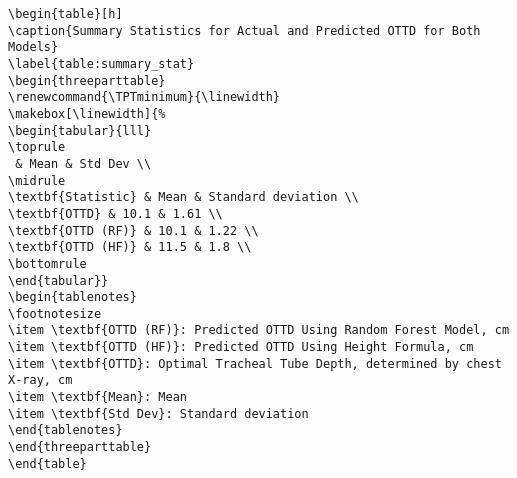 \documentclass[11pt]{article}
\begin{document}
\begin{Verbatim}[tabsize=4]
\begin{table}[h]
\caption{Summary Statistics for Actual and Predicted OTTD for Both Models}
\label{table:summary_stat}
\begin{threeparttable}
\renewcommand{\TPTminimum}{\linewidth}
\makebox[\linewidth]{%
\begin{tabular}{lll}
\toprule
 & Mean & Std Dev \\
\midrule
\textbf{Statistic} & Mean & Standard deviation \\
\textbf{OTTD} & 10.1 & 1.61 \\
\textbf{OTTD (RF)} & 10.1 & 1.22 \\
\textbf{OTTD (HF)} & 11.5 & 1.8 \\
\bottomrule
\end{tabular}}
\begin{tablenotes}
\footnotesize
\item \textbf{OTTD (RF)}: Predicted OTTD Using Random Forest Model, cm
\item \textbf{OTTD (HF)}: Predicted OTTD Using Height Formula, cm
\item \textbf{OTTD}: Optimal Tracheal Tube Depth, determined by chest X-ray, cm
\item \textbf{Mean}: Mean
\item \textbf{Std Dev}: Standard deviation
\end{tablenotes}
\end{threeparttable}
\end{table}

\end{Verbatim}
\end{document}
